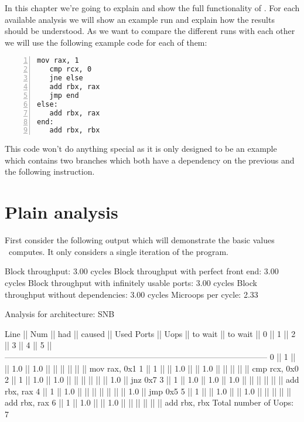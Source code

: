 In this chapter we're going to explain and show the full functionality of \suaca. For each available analysis we will show an example run and explain how the results should be understood. As we want to compare the different runs with each other we will use the following example code for each of them:

\begin{mdframed}[backgroundcolor=light-gray, roundcorner=10pt,leftmargin=1, rightmargin=1, innerleftmargin=15, innertopmargin=1,innerbottommargin=1, outerlinewidth=1, linecolor=light-gray]
\begin{lstlisting}[language={myLang}, basicstyle=\small, numbers=left]
   mov rax, 1
   cmp rcx, 0
   jne else
   add rbx, rax
   jmp end
else:
   add rbx, rax
end:
   add rbx, rbx
\end{lstlisting}
\end{mdframed}

This code won't do anything special as it is only designed to be an example which contains two branches which both have a dependency on the previous and the following instruction.

\section{Plain analysis}
\label{sec:plain}

First consider the following output which will demonstrate the basic values \suaca\ computes. It only considers a single iteration of the program.


\begin{example}
Block throughput: 3.00 cycles
Block throughput with perfect front end: 3.00 cycles
Block throughput with infinitely usable ports: 3.00 cycles
Block throughput without dependencies: 3.00 cycles
Microops per cycle: 2.33

Analysis for architecture: SNB

 Line  ||   Num   ||   had   || caused  ||            Used Ports
       ||   Uops  || to wait || to wait ||   0   ||   1   ||   2   ||   3   ||   4   ||   5   ||
 ------------------------------------------------------------------------------------------------
   0   ||    1    ||         ||   1.0   ||  1.0  ||       ||       ||       ||       ||       || mov rax, 0x1
   1   ||    1    ||         ||   1.0   ||       ||  1.0  ||       ||       ||       ||       || cmp rcx, 0x0
   2   ||    1    ||   1.0   ||   1.0   ||       ||       ||       ||       ||       ||  1.0  || jnz 0x7
   3   ||    1    ||   1.0   ||   1.0   ||  1.0  ||       ||       ||       ||       ||       || add rbx, rax
   4   ||    1    ||   1.0   ||         ||       ||       ||       ||       ||       ||  1.0  || jmp 0x5
   5   ||    1    ||         ||   1.0   ||       ||  1.0  ||       ||       ||       ||       || add rbx, rax
   6   ||    1    ||   1.0   ||         ||  1.0  ||       ||       ||       ||       ||       || add rbx, rbx
Total number of Uops: 7
\end{example}


